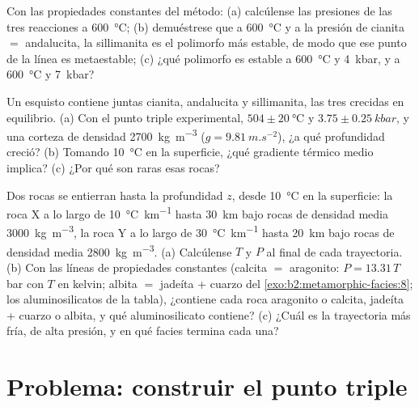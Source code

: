 \begin{exercise}[$\star\star\star$]\label{exo:b2:metamorphic-facies:10}
Con las propiedades constantes del método: (a) calcúlense las presiones de las tres
reacciones a \qty{600}{\celsius}; (b) demuéstrese que a \qty{600}{\celsius} y a la presión de
cianita $=$ andalucita, la sillimanita es el polimorfo más estable, de modo que ese punto de
la línea es metaestable; (c) ¿qué polimorfo es estable a \qty{600}{\celsius} y
\qty{4}{kbar}, y a \qty{600}{\celsius} y \qty{7}{kbar}?
\end{exercise}

\begin{exercise}[$\star\star\star$]\label{exo:b2:metamorphic-facies:11}
Un esquisto contiene juntas cianita, andalucita y sillimanita, las tres crecidas en
equilibrio. (a) Con el punto triple experimental, $504 \pm \qty{20}{\celsius}$ y
$3.75 \pm \qty{0.25}{kbar}$, y una corteza de densidad \qty{2700}{kg.m^{-3}} ($g =
\qty{9.81}{m.s^{-2}}$), ¿a qué profundidad creció? (b) Tomando \qty{10}{\celsius} en la
superficie, ¿qué gradiente térmico medio implica? (c) ¿Por qué son raras esas rocas?
\end{exercise}

\begin{exercise}[$\star\star\star$]\label{exo:b2:metamorphic-facies:12}
Dos rocas se entierran hasta la profundidad $z$, desde \qty{10}{\celsius} en la superficie: la roca X a lo largo de
\qty{10}{\celsius.km^{-1}} hasta \qty{30}{km} bajo rocas de densidad media
\qty{3000}{kg.m^{-3}}, la roca Y a lo largo de \qty{30}{\celsius.km^{-1}} hasta \qty{20}{km} bajo rocas
de densidad media \qty{2800}{kg.m^{-3}}. (a) Calcúlense $T$ y $P$ al final de cada trayectoria.
(b) Con las líneas de propiedades constantes (calcita $=$ aragonito: $P = 13.31\,T$ bar con $T$
en kelvin; albita $=$ jadeíta + cuarzo del \cref{exo:b2:metamorphic-facies:8}; los aluminosilicatos de la
tabla), ¿contiene cada roca aragonito o calcita, jadeíta + cuarzo o albita, y qué
aluminosilicato contiene? (c) ¿Cuál es la trayectoria más fría, de alta presión, y en qué facies termina cada una?
\end{exercise}

\section{Problema: construir el punto triple}


